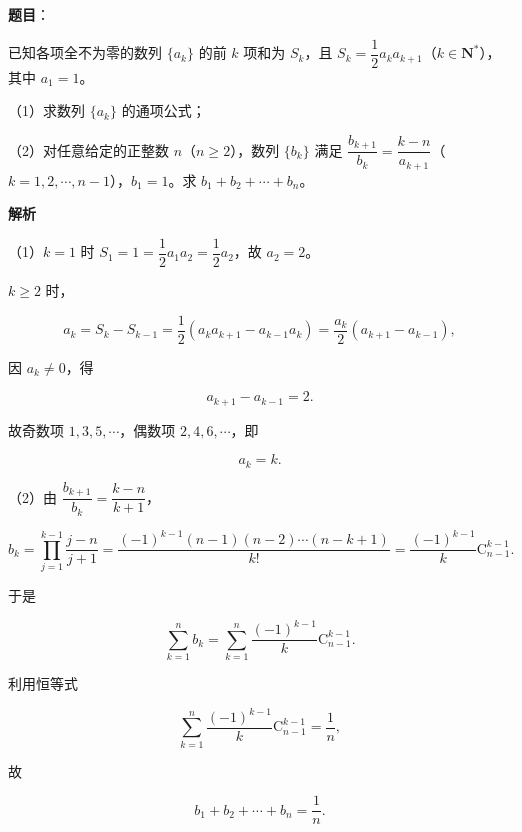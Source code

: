 \begin{answer}

\textbf{题目}：

已知各项全不为零的数列 $\{a_k\}$ 的前 $k$ 项和为 $S_k$，且 $S_k=\dfrac12a_ka_{k+1}$（$k\in\mathbf N^*$），其中 $a_1=1$。

（1）求数列 $\{a_k\}$ 的通项公式；

（2）对任意给定的正整数 $n$（$n\geqslant2$），数列 $\{b_k\}$ 满足 $\dfrac{b_{k+1}}{b_k}=\dfrac{k-n}{a_{k+1}}$（$k=1,2,\cdots,n-1$），$b_1=1$。求 $b_1+b_2+\cdots+b_n$。

\textbf{解析}

（1）$k=1$ 时 $S_1=1=\dfrac12a_1a_2=\dfrac12a_2$，故 $a_2=2$。

$k\geqslant2$ 时，

\nopagebreak[4]
\[a_k=S_k-S_{k-1}=\frac12(a_ka_{k+1}-a_{k-1}a_k)=\frac{a_k}2(a_{k+1}-a_{k-1}),\]

因 $a_k\neq0$，得

\nopagebreak[4]
\[a_{k+1}-a_{k-1}=2.\]

故奇数项 $1,3,5,\cdots$，偶数项 $2,4,6,\cdots$，即

\nopagebreak[4]
\[a_k=k.\]

（2）由 $\dfrac{b_{k+1}}{b_k}=\dfrac{k-n}{k+1}$，

\nopagebreak[4]
\[b_k=\prod_{j=1}^{k-1}\frac{j-n}{j+1}
=\frac{(-1)^{k-1}(n-1)(n-2)\cdots(n-k+1)}{k!}
=\frac{(-1)^{k-1}}k\mathrm C_{n-1}^{k-1}.\]

于是

\nopagebreak[4]
\[\sum_{k=1}^n b_k=\sum_{k=1}^n\frac{(-1)^{k-1}}k\mathrm C_{n-1}^{k-1}.\]

利用恒等式

\nopagebreak[4]
\[\sum_{k=1}^n\frac{(-1)^{k-1}}k\mathrm C_{n-1}^{k-1}=\frac1n,\]

故

\nopagebreak[4]
\[b_1+b_2+\cdots+b_n=\frac1n.\]


\end{answer}